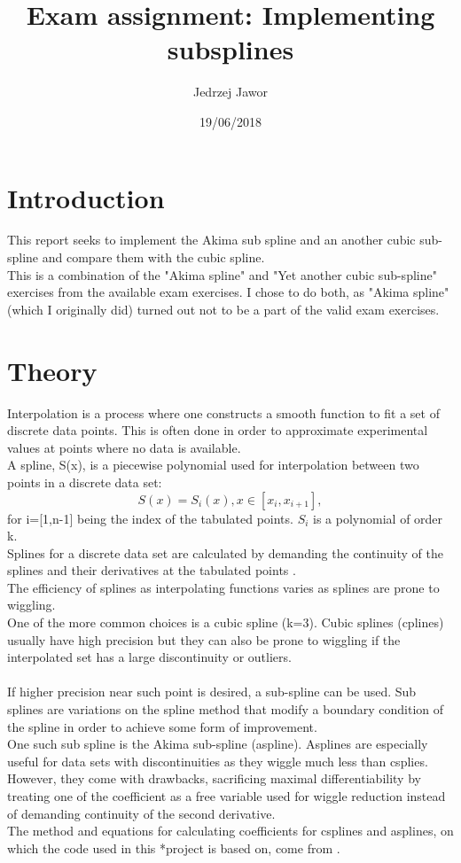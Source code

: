 \documentclass{article}
\begin{document}
\title{Exam assignment: Implementing subsplines}
\author{Jedrzej Jawor}
\date{19/06/2018}
\maketitle

\section{Introduction}
This report seeks to implement the Akima sub spline and an another cubic sub-spline and compare them with the cubic spline.
\\
This is a combination of the "Akima spline" and "Yet another cubic sub-spline" exercises from the available exam exercises.
I chose to do both, as "Akima spline" (which I originally did) turned out not to be a part of the valid exam exercises.

\section{Theory}
Interpolation is a process where one constructs a smooth function to fit a set of discrete data points.
This is often done in order to approximate experimental values at points where no data is available.
\\
A spline, S(x), is a piecewise polynomial used for interpolation between two points in a discrete data set:
\begin{equation}
\label{eq:spline}
S(x)=S_i(x), x \in [x_i,x_{i+1}],
\end{equation}
for i=[1,n-1] being the index of the tabulated points.
$S_i$ is a polynomial of order k.
\\
Splines for a discrete data set are calculated by demanding the continuity of the splines and their 
derivatives at the tabulated points \cite{Prakprog}.
\\
The efficiency of splines as interpolating functions varies as splines are
prone to wiggling.
\\
One of the more common choices is a cubic spline (k=3). Cubic splines (cplines) usually have high precision 
but they can also be prone to wiggling if the interpolated set has a large discontinuity or outliers.
\\
\\
If higher precision near such point is desired, a sub-spline can be used. Sub splines are variations
 on the spline method that modify a boundary condition of the spline in order to achieve some form of improvement.
\\
One such sub spline is the Akima sub-spline (aspline).
Asplines are especially useful for data sets with discontinuities as they wiggle much less 
than csplies. However, they come with drawbacks, sacrificing maximal differentiability by 
treating one of the coefficient as a free variable used for wiggle reduction instead of demanding continuity of 
the second derivative.
\\
The method and equations for calculating coefficients for csplines and asplines, on which the code used in this 
*project is based on, come from \cite{Prakprog}.
\end{document}
